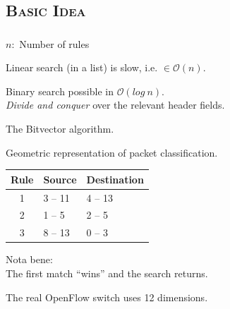 \documentclass[xcolor=x11names,compress]{beamer}
\renewcommand{\(}{\begin{columns}}
\renewcommand{\)}{\end{columns}}
\newcommand{\<}[1]{\begin{column}{#1}}
\renewcommand{\>}{\end{column}}
\begin{document}
\subsection{\scshape Basic Idea}
\begin{frame}
  \frametitle{\insertsubsection}
  $n:$ Number of rules
  \begin{tcolorbox}[colback=red!5!white,colframe=red!75!black,title=Problem,drop fuzzy shadow]
  Linear search (in a list) is slow, i.e. $\in \mathcal O(n)$.
  \end{tcolorbox}
  \pause
  \begin{tcolorbox}[colback=teal!5!white,colframe=teal!75!black,title=Idea,drop fuzzy shadow]
  Binary search possible in $\mathcal O(log\ n)$.\\
  \textit{Divide and conquer} over the relevant header fields.
  \end{tcolorbox}
  \pause
  \begin{tcolorbox}[colback=blue!5!white,colframe=blue!75!black,title=Possible solution,drop fuzzy shadow]
  The Bitvector algorithm.
  \end{tcolorbox}
\end{frame}

\begin{frame}
  Geometric representation of packet classification.
  \begin{table}
  \centering
  \begin{tabularx}{0.7\textwidth}{c|X|X}
  Rule&Source&Destination\\
  \hline
  1&3 -- 11&4 -- 13\\
  2&1 -- 5&2 -- 5\\
  3&8 -- 13&0 -- 3\\
  \end{tabularx}
  \end{table}
  Nota bene:\\
  The first match \enquote{wins} and the search returns.
  
  The real OpenFlow switch uses 12 dimensions.
\end{frame}
\end{document}
